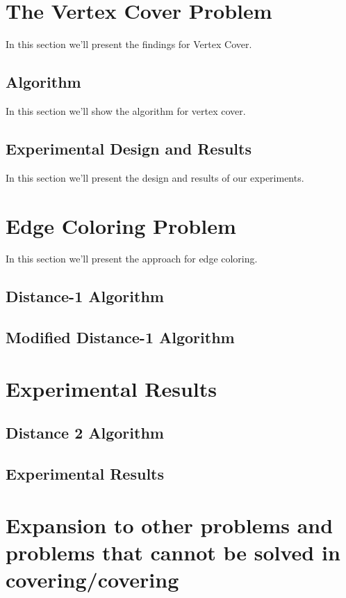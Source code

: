 \documentclass[twoside]{article}
\begin{document}
\section{The Vertex Cover Problem}

In this section we'll present the findings for Vertex Cover.

\subsection{Algorithm}

In this section we'll show the algorithm for vertex cover.

\subsection{Experimental Design and Results}

In this section we'll present the design and results of our experiments.

\section{Edge Coloring Problem}

In this section we'll present the approach for edge coloring.

\subsection{Distance-1 Algorithm}

\subsection{Modified Distance-1 Algorithm}


\section{Experimental Results}


\subsection{Distance 2 Algorithm}
\subsection{Experimental Results}

\section{Expansion to other problems and problems that cannot be solved in covering/covering}



\end{document}
